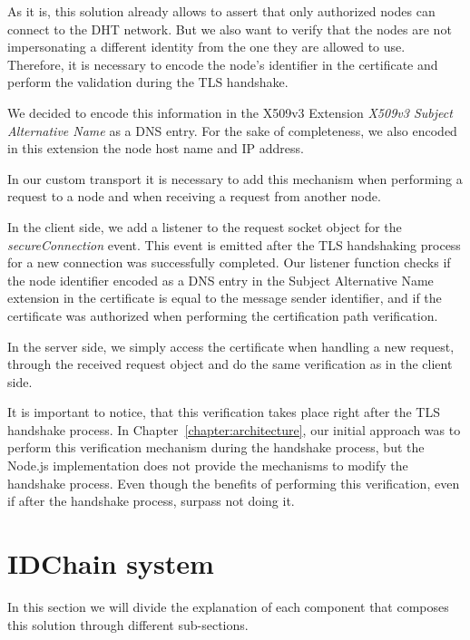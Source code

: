 

As it is, this solution already allows to assert that only authorized nodes can connect to the DHT network.
But we also want to verify that the nodes are not impersonating a different identity from the one they are allowed to use.
Therefore, it is necessary to encode the node's identifier in the certificate and perform the validation during the TLS handshake.

We decided to encode this information in the X509v3 Extension \textit{X509v3 Subject Alternative Name} as a DNS entry.
For the sake of completeness, we also encoded in this extension the node host name and IP address.

In our custom transport it is necessary to add this mechanism when performing a request to a node and when receiving a request from another node.

In the client side, we add a listener to the request socket object for the \textit{secureConnection} event.
This event is emitted after the TLS handshaking process for a new connection was successfully completed.
Our listener function checks if the node identifier encoded as a DNS entry in the Subject Alternative Name extension in the certificate is equal to the message sender identifier, and if the certificate was authorized when performing the certification path verification.


In the server side, we simply access the certificate when handling a new request, through the received request object and do the same verification as in the client side.

It is important to notice, that this verification takes place right after the TLS handshake process.
In Chapter~\ref{chapter:architecture}, our initial approach was to perform this verification mechanism during the handshake process, but the Node.js implementation does not provide the mechanisms to modify the handshake process.
Even though the benefits of performing this verification, even if after the handshake process, surpass not doing it.

\section{IDChain system}\label{implementation:idchain}

In this section we will divide the explanation of each component that composes this solution through different sub-sections.

